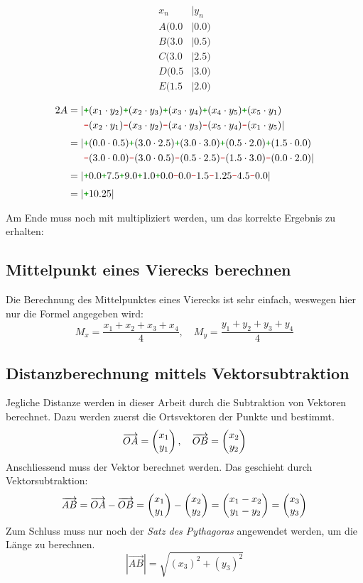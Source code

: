 \begin{minipage}[t]{0.2\textwidth}
    \begin{align*}
        x_n &| y_n \\[3pt]
        A(0.0 &| 0.0) \\
        B(3.0 &| 0.5) \\
        C(3.0 &| 2.5) \\
        D(0.5 &| 3.0) \\
        E(1.5 &| 2.0)
    \end{align*}
\end{minipage}
\vline
\begin{minipage}[t]{0.7\textwidth}
    \begin{align*}
        2A = |&\cp (x_1 \cdot y_2) \cp (x_2 \cdot y_3) \cp (x_3 \cdot y_4) \cp (x_4 \cdot y_5) \cp (x_5 \cdot y_1) \\
        &\cm (x_2 \cdot y_1) \cm (x_3 \cdot y_2) \cm (x_4 \cdot y_3) \cm (x_5 \cdot y_4) \cm (x_1 \cdot y_5)| \\[3pt]
        = |&\cp (0.0 \cdot 0.5) \cp (3.0 \cdot 2.5) \cp (3.0 \cdot 3.0) \cp (0.5 \cdot 2.0) \cp (1.5 \cdot 0.0) \\
        &\cm (3.0 \cdot 0.0) \cm (3.0 \cdot 0.5) \cm (0.5 \cdot 2.5) \cm (1.5 \cdot 3.0) \cm (0.0 \cdot 2.0)| \\[3pt]
        = |&\cp 0.0 \cp 7.5 \cp 9.0 \cp 1.0 \cp 0.0 \cm 0.0 \cm 1.5 \cm 1.25 \cm 4.5 \cm 0.0| \\[3pt]
        = |&\cp 10.25|
    \end{align*}
\end{minipage}

Am Ende muss noch mit  multipliziert werden, um das korrekte Ergebnis zu erhalten: 

\subsection{Mittelpunkt eines Vierecks berechnen}
Die Berechnung des Mittelpunktes eines Vierecks ist sehr einfach, weswegen hier nur die Formel angegeben wird:
\[
M_x = \frac{x_1 + x_2 + x_3 + x_4}{4}, \quad M_y = \frac{y_1 + y_2 + y_3 + y_4}{4}
\]
\subsection{Distanzberechnung mittels Vektorsubtraktion}
Jegliche Distanze werden in dieser Arbeit durch die Subtraktion von Vektoren berechnet.
Dazu werden zuerst die Ortsvektoren der Punkte  und  bestimmt.
\[
\overrightarrow{OA} = \begin{pmatrix} x_1 \\ y_1 \end{pmatrix}, \quad \overrightarrow{OB} = \begin{pmatrix} x_2 \\ y_2 \end{pmatrix}
\]
Anschliessend muss der Vektor  berechnet werden.
Das geschieht durch Vektorsubtraktion:
\[
\overrightarrow{AB} = \overrightarrow{OA} - \overrightarrow{OB} = \begin{pmatrix} x_1 \\ y_1 \end{pmatrix} - \begin{pmatrix} x_2 \\ y_2 \end{pmatrix} = \begin{pmatrix} x_1-x_2 \\ y_1-y_2 \end{pmatrix} = \begin{pmatrix} x_3 \\ y_3 \end{pmatrix}
\]
Zum Schluss muss nur noch der \textit{Satz des Pythagoras} angewendet werden, um die Länge  zu berechnen.
\[
|\overrightarrow{AB}| = \sqrt{(x_3)^2 + (y_3)^2}
\]

